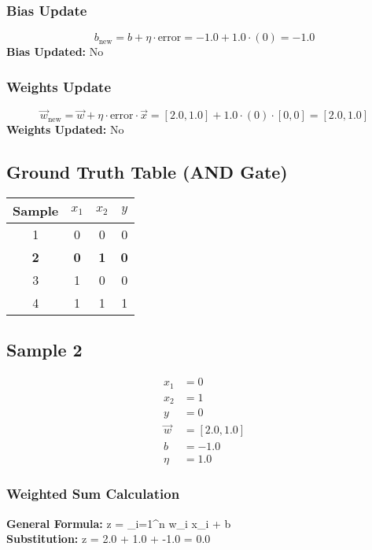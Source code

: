 \documentclass{article}
\begin{document}
\subsubsection*{Bias Update}
\[
b_{\text{new}} = b + \eta \cdot \text{error} = -1.0 + 1.0 \cdot (0) = -1.0
\]
\textbf{Bias Updated:} No

\subsubsection*{Weights Update}
\[
\vec{w}_{\text{new}} = \vec{w} + \eta \cdot \text{error} \cdot \vec{x} = 
[2.0, 1.0] + 1.0 \cdot (0) \cdot [0, 0] = 
[2.0, 1.0]
\]
\textbf{Weights Updated:} No

\subsection*{Ground Truth Table (AND Gate)}
\begin{center}
\begin{tabular}{|c|c|c|c|}
\hline
\textbf{Sample} & $x_1$ & $x_2$ & $y$ \\
\hline
1 & 0 & 0 & 0 \\
\hline
\rowcolor{yellow} \textbf{2} & \textbf{0} & \textbf{1} & \textbf{0} \\
\hline
3 & 1 & 0 & 0 \\
\hline
4 & 1 & 1 & 1 \\
\hline
\end{tabular}
\end{center}

\subsection*{Sample 2}
\begin{align*}
x_1 &= 0 \\
x_2 &= 1 \\
y &= 0 \\
\vec{w} &= [2.0, 1.0] \\
b &= -1.0 \\
\eta &= 1.0
\end{align*}

\subsubsection*{Weighted Sum Calculation}
\textbf{General Formula:} \quad
z = \sum_{i=1}^{n} w_i x_i + b
\\
\textbf{Substitution:} \quad
z = 2.0  + 1.0  + -1.0 = 0.0
\end{document}
